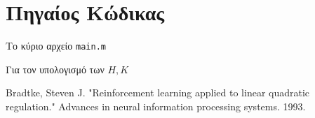 \documentclass[a4paper,oneside,12pt]{article}
\begin{document}
\section{Πηγαίος Κώδικας}

Το κύριο αρχείο \texttt{main.m}



\newpage
Για τον υπολογισμό των $H, K$





\begin{thebibliography}{9}

 Bradtke, Steven J. "Reinforcement learning applied to linear quadratic regulation." Advances in neural information processing systems. 1993.

\end{thebibliography}
\end{document}
